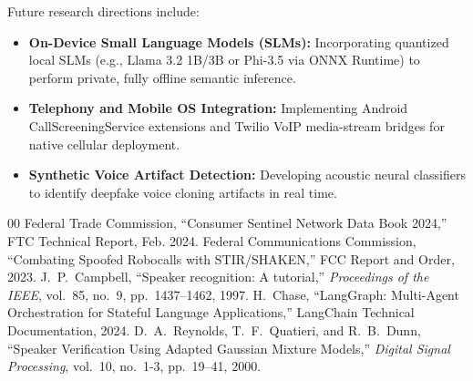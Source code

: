 \documentclass[conference]{IEEEtran}
\begin{document}
Future research directions include:
\begin{itemize}
    \item \textbf{On-Device Small Language Models (SLMs):} Incorporating quantized local SLMs (e.g., Llama 3.2 1B/3B or Phi-3.5 via ONNX Runtime) to perform private, fully offline semantic inference.
    \item \textbf{Telephony and Mobile OS Integration:} Implementing Android CallScreeningService extensions and Twilio VoIP media-stream bridges for native cellular deployment.
    \item \textbf{Synthetic Voice Artifact Detection:} Developing acoustic neural classifiers to identify deepfake voice cloning artifacts in real time.
\end{itemize}

\begin{thebibliography}{00}
 Federal Trade Commission, ``Consumer Sentinel Network Data Book 2024,'' FTC Technical Report, Feb. 2024.
 Federal Communications Commission, ``Combating Spoofed Robocalls with STIR/SHAKEN,'' FCC Report and Order, 2023.
 J.~P.~Campbell, ``Speaker recognition: A tutorial,'' \textit{Proceedings of the IEEE}, vol.~85, no.~9, pp.~1437--1462, 1997.
 H.~Chase, ``LangGraph: Multi-Agent Orchestration for Stateful Language Applications,'' LangChain Technical Documentation, 2024.
 D.~A.~Reynolds, T.~F.~Quatieri, and R.~B.~Dunn, ``Speaker Verification Using Adapted Gaussian Mixture Models,'' \textit{Digital Signal Processing}, vol.~10, no.~1-3, pp.~19--41, 2000.
\end{thebibliography}
\end{document}
